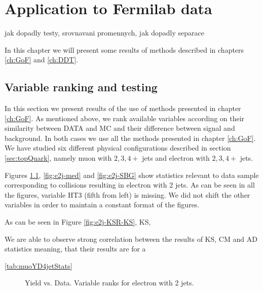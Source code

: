 \chapter{Application to Fermilab data}
jak dopadly testy, srovnavani promennych, jak dopadly separace

\noindent In this chapter we will present some results of methods described in chapters \ref{ch:GoF} and \ref{ch:DDT}. 

\section{Variable ranking and testing}
In this section we present results  of the use of methods presented in chapter \ref{ch:GoF}. As mentioned above, we rank available variables according on their similarity between DATA and MC and their difference between signal and background. In both cases we use all the methods presented in chapter \ref{ch:GoF}. We have studied six different physical configurations described in section \ref{sec:topQuark}, namely muon with $2, 3, 4+$ jets and electron with $2, 3, 4+$ jets.
	
Figures \ref{fig:e2j-KSR}, \ref{fig:e2j-med} and \ref{fig:e2j-SBG} show statistics relevant to data sample corresponding to collisions resulting in electron with $2$ jets. As can be seen in all the figures, variable HT3 (fifth from left) is missing. We did not shift the other variables in order to maintain a constant format of the figures.

As can be seen in Figure \ref{fig:e2j-KSR-KS}, KS,  

We are able to observe strong correlation between the results of KS, CM and AD statistics meaning, that their results are for a

\ref{tab:muoYD4jetStats}

\begin{figure}[htb]
    \centering
	\quad
    \caption{Yield vs. Data. Variable ranks for electron with 2 jets.}
     \label{fig:e2j-KSR}
\end{figure}	

